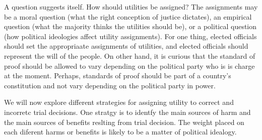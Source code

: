 \documentclass[10pt,dvipsnames,enabledeprecatedfontcommands]{scrartcl}
\begin{document}
A question suggests itself. How should utilities be assigned? The
assignments may be a moral question (what the right conception of
justice dictates), an empirical question (what the majority thinks the
utilities should be), or a political question (how political ideologies
affect utility assignments). For one thing, elected officials should set
the appropriaate assignments of utilities, and elected officials should
represent the will of the people. On other hand, it is curious that the
standard of proof should be allowed to vary depending on the political
party who is is charge at the moment. Perhaps, standards of proof should
be part of a country's constitution and not vary depending on the
political party in power.

We will now explore different strategies for assigning utility to
correct and incorretc trial decisions. One stratgy is to identfy the
main sources of harm and the main sources of benefits reslting from
trial decision. The weight placed on each diferent harms or benefits is
likely to be a matter of political idealogy.
\end{document}
